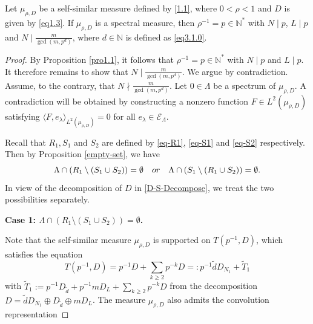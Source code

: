 \documentclass[10pt,a4paper]{amsart}
\begin{document}
\begin{theorem}\label{thm3.2}
Let $\mu_{\rho,D}$ be a self-similar measure defined by \eqref{1.1}, where $0<\rho<1$ and $D$ is given by \eqref{eq1.3}. If $\mu_{\rho,D}$ is a spectral measure, then $\rho^{-1}=p\in\mathbb{N}^*$ with $N\mid p$, $L\mid p$ and $N\mid\frac{m}{\gcd(m,p^d)}$, where $d \in \mathbb{N}$ is defined as \eqref{eq3.1.0}.
\end{theorem}

\begin{proof}
By Proposition \ref{pro1.1}, it follows that $\rho^{-1}=p\in\mathbb{N}^*$ with $N\mid p$ and $L\mid p$. It therefore remains to show that $N\mid\frac{m}{\gcd(m,p^d)}$. We argue by contradiction. Assume, to the contrary, that $N\nmid\frac{m}{\gcd(m,p^d)}$.  Let $0\in\Lambda$ be a spectrum of $\mu_{\rho,D}$. A contradiction will be obtained by constructing a nonzero function
$F \in L^2(\mu_{\rho,D})$ satisfying
$\langle F,e_{\lambda} \rangle_{L^2(\mu_{\rho,D})}=0$ for all $e_{\lambda}\in \mathcal{E}_\Lambda$. %

\medskip
Recall that $R_1, S_1$ and $S_2$ are defined by \eqref{eq-R1}, \eqref{eq-S1} and \eqref{eq-S2} respectively.
Then by Proposition  \ref{empty-set}, we have
$$
\Lambda\cap (R_1 \setminus (S_1\cup S_2))=\emptyset \quad {\rm{or}} \quad\Lambda\cap (S_1 \setminus (R_1\cup S_2))=\emptyset.
$$
In view of the decomposition of $D$ in \eqref{D-S-Decompose}, we treat the two possibilities separately.


\medskip
\textbf{Case 1: $\Lambda\cap (R_1 \setminus (S_1\cup S_2))=\emptyset$.}

Note that the self-similar measure $\mu_{\rho,D}$ is supported on $T(p^{-1},D)$, which satisfies the equation
$$T(p^{-1},D)=p^{-1}D +\sum_{k \ge 2}p^{-k}D =: p^{-1}\tilde{d}D_{N_1}+ \tilde{T}_1$$
with $\tilde{T}_1:= p^{-1}D_{\tilde{d}}+p^{-1}mD_{L}+\sum_{k \ge 2}p^{-k}D$ from the decomposition $D=\tilde{d}D_{N_1}\oplus D_{\tilde{d}}\oplus mD_{L}$. The measure $\mu_{\rho,D}$  also admits the convolution representation


\end{proof}
\end{document}
